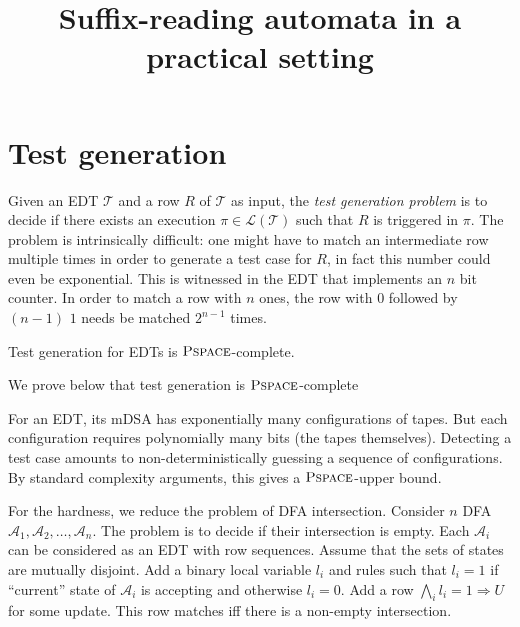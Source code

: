 \documentclass[a4paper, 11pt]{llncs}
\newcommand{\Aa}{\mathcal{A}}
\newcommand{\Ll}{\mathcal{L}}
\newcommand{\imp}{\Rightarrow}
\newcommand{\Land}{\bigwedge}
\newcommand{\PSPACE}{\operatorname{\textsc{Pspace}}}
\newcommand{\Tt}{\mathcal{T}}
\begin{document}
\title{Suffix-reading automata in a practical setting}

\maketitle





\section{Test generation}
\label{sec:test-generation}

Given an EDT $\Tt$ and a row $R$ of $\Tt$ as input, the \emph{test
  generation problem} is to decide if there exists an execution
$\pi \in \Ll(\Tt)$ such that $R$ is triggered in $\pi$.
%
The problem is
intrinsically difficult: one might have to match an intermediate row
multiple times in order to generate a test case for $R$, in fact this
number could even be exponential. This is witnessed in the EDT that
implements an $n$ bit counter. In order to match a row with $n$ ones,
the row with $0$ followed by $(n-1)$ $1$ needs be matched $2^{n-1}$
times. 
%

\begin{theorem}
  \label{thm:test-generation-PSPACE}
  Test generation for EDTs is $\PSPACE$-complete.
\end{theorem}

We prove below that test generation is $\PSPACE$-complete

For an EDT, its mDSA has exponentially many
configurations of tapes. But each configuration requires polynomially many bits (the tapes themselves). Detecting a test
case amounts to non-deterministically guessing a sequence of configurations. By standard complexity arguments, this gives a
$\PSPACE$-upper bound. %

For the hardness, we reduce the problem of DFA
intersection. Consider $n$ DFA $\Aa_1, \Aa_2, \dots, \Aa_n$. The
problem is to decide if their intersection is empty. Each $\Aa_i$
can be considered as an EDT with row sequences. Assume that the sets
of states are mutually disjoint. Add a binary local variable $l_i$ and rules
such that $l_i = 1$ if ``current'' state of $\Aa_i$ is accepting and
otherwise $l_i = 0$. Add a row $\Land_i l_i = 1 \imp U$ for some
update. This row matches iff there is a non-empty intersection.
\end{document}
